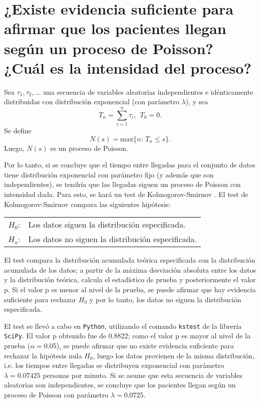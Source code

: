 \maketitle
\section{¿Existe evidencia suficiente para afirmar que los pacientes llegan según un proceso de Poisson? ¿Cuál es la intensidad del proceso?}
\begin{theorem}
Sea $\tau_1,\tau_2,\ldots$ una secuencia de variables aleatorias independientes e idénticamente distribuidas con distribución exponencial (con parámetro $\lambda$), y sea\[
T_n=\sum_{i=1}^n\tau_i, \ \ T_0=0.
\]
Se define \[N(s)=\mathrm{max}\{n:\,T_n\leq s\}.\] Luego, $N(s)$ es un proceso de Poisson.
\end{theorem}
Por lo tanto, si se concluye que el tiempo entre llegadas para el conjunto de datos tiene distribución exponencial con parámetro fijo (y además que son independientes), se tendría que las llegadas siguen un proceso de Poisson con intensidad dada. Para esto, se hará un test de Kolmogorov-Smirnov \cite[pp. 305-306]{banks2010discrete}. El test de Kolmogorov-Smirnov compara las siguientes hipótesis:
\begin{center}
\begin{tabular}{rl}
     $H_0$: & Los datos siguen la distribución especificada. \\
     $H_a$: & Los datos no siguen la distribución especificada. 
\end{tabular}
\end{center}
El test compara la distribución acumulada teórica especificada con la distribución acumulada de los datos; a partir de la máxima desviación absoluta entre los datos y la distribución teórica, calcula el estadístico de prueba y posteriormente el valor p. Si el valor p es menor al nivel de la prueba, se puede afirmar que hay evidencia suficiente para rechazar $H_0$ y por lo tanto, los datos no siguen la distribución especificada.

El test se llevó a cabo en \texttt{Python}, utilizando el comando \texttt{kstest} de la librería \texttt{SciPy}. El valor p obtenido fue de 0.8822; como el valor p es mayor al nivel de la prueba ($\alpha=$0.05), se puede afirmar que no existe evidencia suficiente para rechazar la hipótesis nula $H_0$, luego los datos provienen de la misma distribución, i.e. los tiempos entre llegadas se distribuyen exponencial con parámetro $\lambda=0.07425$ personas por minuto. Si se asume que esta secuencia de variables aleatorias son independientes, se concluye que los pacientes llegan según un proceso de Poisson con parámetro $\lambda=0.0725$.


